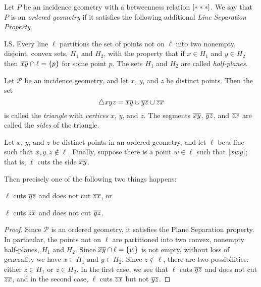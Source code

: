 \begin{dfn}
Let \(P\) be an incidence geometry with a betweenness relation \([ \ast \ast \ast ]\). We say that \(P\) is an \emph{ordered geometry} if it satisfies the following additional \emph{Line Separation Property}.
\begin{proplist}
\item[LS.] Every line \(\ell\) partitions the set of points not on \(\ell\) into two nonempty, disjoint, convex sets, \(H_1\) and \(H_2\), with the property that if \(x \in H_1\) and \(y \in H_2\) then \(\overline{xy} \cap \ell = \{p\}\) for some point \(p\). The sets \(H_1\) and \(H_2\) are called \emph{half-planes}.
\end{proplist}
\end{dfn}

\begin{dfn}[Triangle]
Let \(\mathcal{P}\) be an incidence geometry, and let \(x\), \(y\), and \(z\) be distinct points. Then the set \[ \bigtriangleup{xyz} = \overline{xy} \cup \overline{yz} \cup \overline{zx} \] is called the \emph{triangle} with \emph{vertices} \(x\), \(y\), and \(z\). The segments \(\overline{xy}\), \(\overline{yz}\), and \(\overline{zx}\) are called the \emph{sides} of the triangle.
\end{dfn}

\begin{prop}
Let \(x\), \(y\), and \(z\) be distinct points in an ordered geometry, and let \(\ell\) be a line such that \(x,y,z \notin \ell\). Finally, suppose there is a point \(w \in \ell\) such that \([ x w y ]\); that is, \(\ell\) cuts the side \(\overline{xy}\).

Then precisely one of the following two things happens:
\begin{proplist}
\item \(\ell\) cuts \(\overline{yz}\) and does not cut \(\overline{zx}\), or
\item \(\ell\) cuts \(\overline{zx}\) and does not cut \(\overline{yz}\).
\end{proplist}
\end{prop}

\begin{proof}
Since \(\mathcal{P}\) is an ordered geometry, it satisfies the Plane Separation property. In particular, the points not on \(\ell\) are partitioned into two convex, nonempty half-planes, \(H_1\) and \(H_2\). Since \(\overline{xy} \cap \ell = \{w\}\) is not empty, without loss of generality we have \(x \in H_1\) and \(y \in H_2\). Since \(z \notin \ell\), there are two possibilities: either \(z \in H_1\) or \(z \in H_2\). In the first case, we see that \(\ell\) cuts \(\overline{yz}\) and does not cut \(\overline{zx}\), and in the second case, \(\ell\) cuts \(\overline{zx}\) but not \(\overline{yz}\).
\end{proof}

